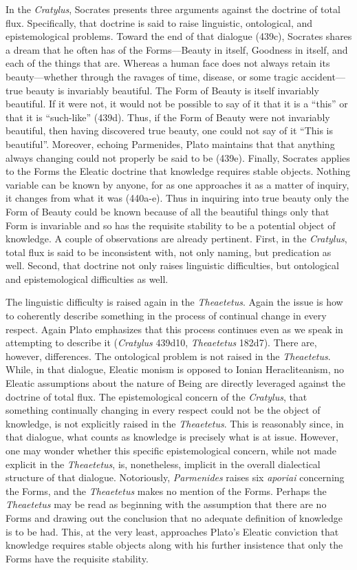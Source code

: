 In the \emph{Cratylus}, Socrates presents three arguments against the doctrine of total flux. Specifically, that doctrine is said to raise linguistic, ontological, and epistemological problems. Toward the end of that dialogue (439c), Socrates shares a dream that he often has of the Forms---Beauty in itself, Goodness in itself, and each of the things that are. Whereas a human face does not always retain its beauty---whether through the ravages of time, disease, or some tragic accident---true beauty is invariably beautiful. The Form of Beauty is itself invariably beautiful. If it were not, it would not be possible to say of it that it is a ``this'' or that it is ``such-like'' (439d). Thus, if the Form of Beauty were not invariably beautiful, then having discovered true beauty, one could not say of it ``This is beautiful''.  Moreover, echoing Parmenides, Plato maintains that that anything always changing could not properly be said to be (439e). Finally, Socrates applies to the Forms the Eleatic doctrine that knowledge requires stable objects. Nothing variable can be known by anyone, for as one approaches it as a matter of inquiry, it changes from what it was (440a-e). Thus in inquiring into true beauty only the Form of Beauty could be known because of all the beautiful things only that Form is invariable and so has the requisite stability to be a potential object of knowledge. A couple of observations are already pertinent. First, in the \emph{Cratylus}, total flux is said to be inconsistent with, not only naming, but predication as well. Second, that doctrine not only raises linguistic difficulties, but ontological and epistemological difficulties as well.

The linguistic difficulty is raised again in the \emph{Theaetetus}. Again the issue is how to coherently describe something in the process of continual change in every respect. Again Plato emphasizes that this process continues even as we speak in attempting to describe it (\emph{Cratylus} 439d10, \emph{Theaetetus} 182d7). There are, however, differences. The ontological problem is not raised in the \emph{Theaetetus}. While, in that dialogue, Eleatic monism is opposed to Ionian Heracliteanism, no Eleatic assumptions about the nature of Being are directly leveraged against the doctrine of total flux. The epistemological concern of the \emph{Cratylus}, that something continually changing in every respect could not be the object of knowledge, is not explicitly raised in the \emph{Theaetetus}. This is reasonably since, in that dialogue, what counts as knowledge is precisely what is at issue. However, one may wonder whether this specific epistemological concern, while not made explicit in the \emph{Theaetetus}, is, nonetheless, implicit in the overall dialectical structure of that dialogue. Notoriously, \emph{Parmenides} raises six \emph{aporiai} concerning the Forms, and the \emph{Theaetetus} makes no mention of the Forms. Perhaps the \emph{Theaetetus} may be read as beginning with the assumption that there are no Forms and drawing out the conclusion that no adequate definition of knowledge is to be had. This, at the very least, approaches Plato's Eleatic conviction that knowledge requires stable objects along with his further insistence that only the Forms have the requisite stability.

